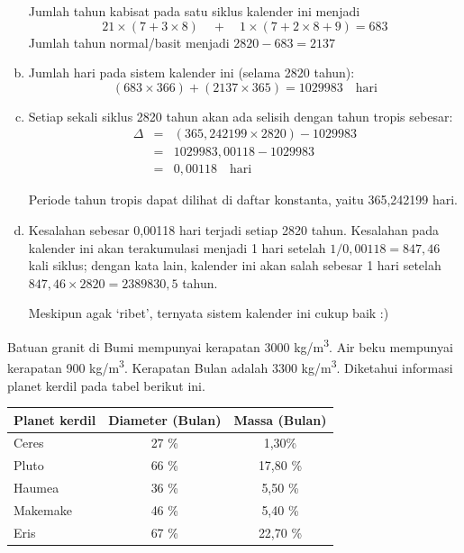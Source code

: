 \documentclass[11pt,fleqn]{exam}
\begin{document}
\begin{questions}
\begin{enumerate}[(a)]
Jumlah tahun kabisat pada satu siklus kalender ini menjadi 
$$21 \times (7 + 3 \times 8) \quad + \quad 1 \times (7 + 2 \times 8 + 9) = 683$$
Jumlah tahun normal/basit menjadi $2820 - 683 = 2137$


\item Jumlah hari pada sistem kalender ini (selama 2820 tahun):
$$(683 \times 366) + (2137 \times 365) = 1029983 \quad \text{hari}$$

\item Setiap sekali siklus 2820 tahun akan ada selisih dengan tahun tropis sebesar:
\begin{eqnarray*}
\Delta &=& (365,242199 \times 2820) - 1029983 \\
&=& 1029983,00118 - 1029983 \\
&=& 0,00118 \quad \text{hari}
\end{eqnarray*}

Periode tahun tropis dapat dilihat di daftar konstanta, yaitu 365,242199 hari.

\item Kesalahan sebesar 0,00118 hari terjadi setiap 2820 tahun. Kesalahan pada kalender ini akan terakumulasi menjadi 1 hari setelah $1/0,00118 = 847,46$ kali siklus; dengan kata lain, kalender ini akan salah sebesar 1 hari setelah $847,46 \times 2820 = 2389830,5$ tahun. 

Meskipun agak `ribet', ternyata sistem kalender ini cukup baik :)

\end{enumerate}

\vspace{0.3cm}
\question Batuan granit di Bumi mempunyai kerapatan 3000 kg/m\textsuperscript{3}. Air beku mempunyai kerapatan 900 kg/m\textsuperscript{3}. Kerapatan Bulan adalah 3300 kg/m\textsuperscript{3}. Diketahui informasi planet kerdil pada tabel berikut ini.

\begin{table}[h!]
\centering
\begin{tabular}{|l|c|c|}
\hline
Planet kerdil & Diameter (Bulan) & Massa (Bulan) \\
\hline
\hline
Ceres & 27 \% & 1,30\% \\
\hline
Pluto & 66 \% & 17,80 \% \\
\hline
Haumea & 36 \% & 5,50 \% \\
\hline
Makemake & 46 \% & 5,40 \% \\
\hline
Eris & 67 \% & 22,70 \% \\
\hline
\end{tabular}
\end{table}


\end{questions}
\end{document}
